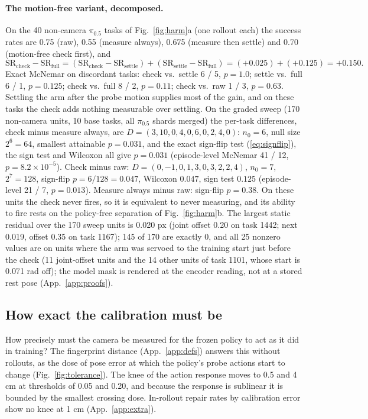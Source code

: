 \documentclass{article}
\newcommand{\pihalf}{$\pi_{0.5}$}
\newcommand{\ph}{\textsuperscript{\dag}}
\begin{document}
\paragraph{The motion-free variant, decomposed\ph.} On the 40 non-camera \pihalf{} tasks of Fig.~\ref{fig:harm}a
(one rollout each) the
success rates are 0.75 (raw), 0.55 (measure always), 0.675 (measure then settle) and 0.70 (motion-free
check first), and
\begin{equation}
\mathrm{SR}_{\mathrm{check}} - \mathrm{SR}_{\mathrm{full}} = (\mathrm{SR}_{\mathrm{check}} - \mathrm{SR}_{\mathrm{settle}})
+ (\mathrm{SR}_{\mathrm{settle}} - \mathrm{SR}_{\mathrm{full}}) = (+0.025) + (+0.125) = +0.150 .
\end{equation}
Exact McNemar on discordant tasks: check vs.\ settle 6 / 5, $p = 1.0$; settle vs.\ full 6 / 1, $p = 0.125$; check vs.\
full 8 / 2, $p = 0.11$; check vs.\ raw 1 / 3, $p = 0.63$. Settling the arm after the probe motion supplies most of the
gain, and on these tasks the check adds nothing measurable over settling. On the graded sweep (170 non-camera units, 10
base tasks, all \pihalf{} shards merged) the per-task differences, check minus measure always, are $D = (3, 10, 0, 4, 0,
6, 0, 2, 4, 0)$: $n_0 = 6$, null size $2^6 = 64$, smallest attainable $p = 0.031$, and the exact sign-flip test
(\ref{eq:signflip}), the sign test and Wilcoxon all give $p = 0.031$ (episode-level McNemar 41 / 12, $p = 8.2\times
10^{-5}$). Check minus raw: $D = (0, -1, 0, 1, 3, 0, 3, 2, 2, 4)$, $n_0 = 7$, $2^7 = 128$, sign-flip $p = 6/128 =
0.047$, Wilcoxon $0.047$, sign test $0.125$ (episode-level 21 / 7, $p = 0.013$). Measure always minus raw: sign-flip $p
= 0.38$. On these units the check never fires, so it is equivalent to never measuring, and its ability to fire rests on
the policy-free separation of Fig.~\ref{fig:harm}b. The largest static residual over the 170 sweep units is 0.020 px
(joint offset 0.20 on task 1442; next 0.019, offset 0.35 on task 1167); 145 of 170 are exactly 0, and all 25 nonzero
values are on units where the arm was servoed to the training start just before the check (11 joint-offset units and
the 14 other units of task 1101, whose start is 0.071 rad off); the model mask is rendered at the encoder reading, not
at a stored rest pose (App.~\ref{app:proofs}).

\subsection{How exact the calibration must be}
\label{app:tolerance}
How precisely must the camera be measured for the frozen policy to act as it did in training? The fingerprint
distance (App.~\ref{app:defs}) answers this without rollouts, as the dose of pose error at which the policy's probe
actions start to change (Fig.~\ref{fig:tolerance}). The knee of the action response moves to 0.5 and 4 cm at thresholds of 0.05 and 0.20, and because the response is sublinear it is bounded by the smallest crossing dose. In-rollout repair rates by calibration error show no knee at 1 cm (App.~\ref{app:extra}).
\end{document}
